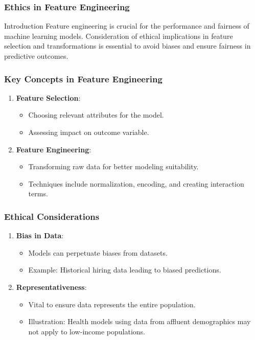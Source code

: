 \documentclass[aspectratio=169]{beamer}
\begin{document}
\begin{frame}[fragile]
    \frametitle{Ethics in Feature Engineering}
    \begin{block}{Introduction}
        Feature engineering is crucial for the performance and fairness of machine learning models. 
        Consideration of ethical implications in feature selection and transformations is essential to avoid biases and ensure fairness in predictive outcomes.
    \end{block}
\end{frame}

\begin{frame}[fragile]
    \frametitle{Key Concepts in Feature Engineering}
    \begin{enumerate}
        \item \textbf{Feature Selection}:
            \begin{itemize}
                \item Choosing relevant attributes for the model.
                \item Assessing impact on outcome variable.
            \end{itemize}
        \item \textbf{Feature Engineering}:
            \begin{itemize}
                \item Transforming raw data for better modeling suitability.
                \item Techniques include normalization, encoding, and creating interaction terms.
            \end{itemize}
    \end{enumerate}
\end{frame}

\begin{frame}[fragile]
    \frametitle{Ethical Considerations}
    \begin{enumerate}
        \item \textbf{Bias in Data}:
            \begin{itemize}
                \item Models can perpetuate biases from datasets.
                \item Example: Historical hiring data leading to biased predictions.
            \end{itemize}
        \item \textbf{Representativeness}:
            \begin{itemize}
                \item Vital to ensure data represents the entire population.
                \item Illustration: Health models using data from affluent demographics may not apply to low-income populations.
            \end{itemize}
    \end{enumerate}
\end{frame}
\end{document}
